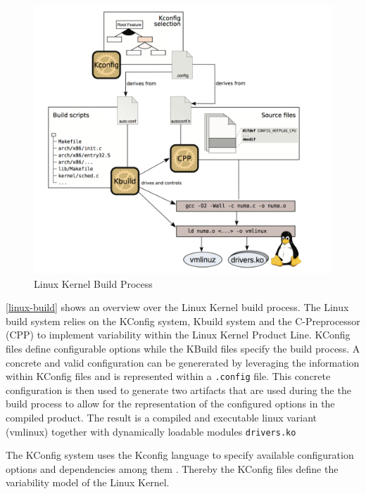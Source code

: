 \documentclass[a4paper]{article}
\begin{document}
\begin{figure}[h] 
  \centering
  \begin{minipage}[b]{1\textwidth} 
    \caption[Linux build process]{Linux Kernel Build Process \cite{Dietrich:2012:RAV:2362536.2362544}}\label{linux-build}
    \includegraphics[width=1\textwidth]{img/linux-build2.png}
  \end{minipage}
\end{figure}

\autoref{linux-build} shows an overview over the Linux Kernel build process. The Linux build system relies on the KConfig system, Kbuild system and the C-Preprocessor (CPP) to implement variability within the Linux Kernel Product Line. KConfig files  define configurable options while the KBuild files specify the build process. A concrete and valid configuration can be genererated by leveraging the information within KConfig files and is represented within a \texttt{.config} file. This concrete configuration is then used to generate two artifacts that are used during the the build process to allow for the representation of the configured options in the compiled product. The result is a compiled and executable linux variant (vmlinux) together with dynamically loadable modules \texttt{drivers.ko}


The KConfig system uses the Kconfig language to specify available configuration options and dependencies among them \cite{variabilitymodel-linux}. Thereby the KConfig files define the variability model of the Linux Kernel. 
\end{document}
